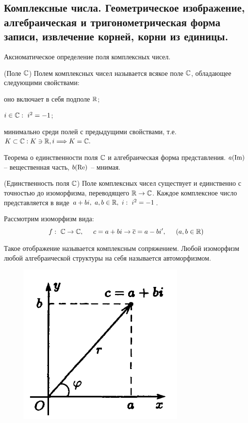 \begin{multicols}{2}
\section{Комплексные числа. Геометрическое изображение, алгебраическая и тригонометрическая форма записи, извлечение корней, корни из единицы.}
Аксиоматическое определение поля комплексных чисел.
\begin{definition}{(Поле $\mathbb{C}$)}{}
    Полем комплексных чисел называется всякое поле $\mathbb{C}$, обладающее следующими свойствами:
    \begin{enumerate*}
        \item оно включает в себя подполе $\mathbb{R}$;
        \item $i \in \mathbb{C}: \ i^2 = -1$;
        \item минимально среди полей с предыдущими свойствами, т.е. $K \subset \mathbb{C}: K \ni \mathbb{R}, i \Longrightarrow K = \mathbb{C}.$
    \end{enumerate*}
\end{definition}
Теорема о единственности поля $\mathbb{C}$ и алгебраическая форма представления. $a (\mathrm{Im})$ -- вещественная часть, $b (\mathrm{Re})$ -- мнимая.
\begin{theorema}{(Единственность поля $\mathbb{C}$)}{}
    Поле комплексных чисел существует и единственно с точностью до изоморфизма, переводящего $\mathbb{R} \to \mathbb{C}$. Каждое комплексное число представляется в виде $a+bi, \ a,b\in \mathbb{R}, \ i: \ i^2 = -1$.
\end{theorema}
Рассмотрим изоморфизм вида:\useshortskip
\[
    f: \ \mathbb{C} \to \mathbb{C}, \hspace*{0.5cm} c=a+bi \to \overline{c} = a-bi', \hspace*{0.5cm} (a,b\in\mathbb{R})
    \]
\par
Такое отображение называется комплексным сопряжением. Любой изоморфизм любой алгебраической структуры на себя называется автоморфизмом.
\begin{figure}
    \includegraphics[scale=0.65]{images/complex_field_trigonometric.png}

\end{figure}
\end{multicols}
